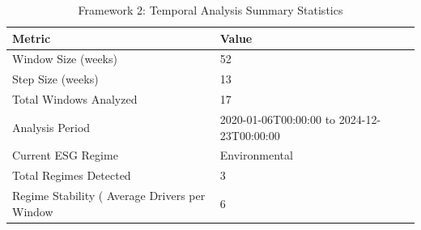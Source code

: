 \begin{table}
\caption{Framework 2: Temporal Analysis Summary Statistics}
\label{tab:temporal_summary}
\begin{tabular}{ll}
\toprule
Metric & Value \\
\midrule
Window Size (weeks) & 52 \\
Step Size (weeks) & 13 \\
Total Windows Analyzed & 17 \\
Analysis Period & 2020-01-06T00:00:00 to 2024-12-23T00:00:00 \\
Current ESG Regime & Environmental \\
Total Regimes Detected & 3 \\
Regime Stability (%
Average Drivers per Window & 6 \\
\bottomrule
\end{tabular}
\end{table}
